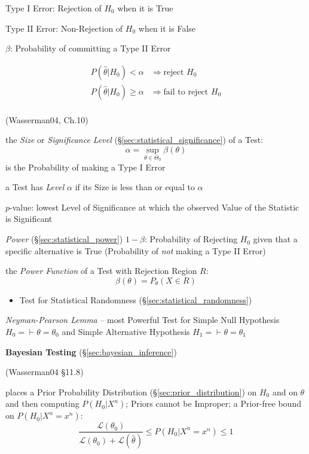 Type I Error: Rejection of $H_0$ when it is True

Type II Error: Non-Rejection of $H_0$ when it is False

$\beta$: Probability of committing a Type II Error

\begin{align*}
  P(\hat{\theta} | H_0) < \alpha & \Rightarrow \text{reject } H_0 \\
  P(\hat{\theta} | H_0) \geq \alpha & \Rightarrow \text{fail to reject } H_0 \\
\end{align*}

(Wasserman04, Ch.10)

the \emph{Size} or \emph{Significance Level}
(\S\ref{sec:statistical_significance}) of a Test:
\[
  \alpha = \sup_{\theta \in \Theta_0} \beta(\theta)
\]
is the Probability of making a Type I Error

a Test has \emph{Level} $\alpha$ if its Size is less than or equal to $\alpha$

$p$-value: lowest Level of Significance at which the observed Value of
the Statistic is Significant

\emph{Power} (\S\ref{sec:statistical_power}) $1 - \beta$: Probability of
Rejecting $H_0$ given that a specific alternative is True (Probability of
\emph{not} making a Type II Error)

the \emph{Power Function} of a Test with Rejection Region $R$:
\[
  \beta(\theta) = P_\theta(X \in R)
\]

\begin{itemize}
  \item Test for Statistical Randomness (\S\ref{sec:statistical_randomness})
\end{itemize}

\emph{Neyman-Pearson Lemma} -- most Powerful Test for Simple Null Hypothesis
$H_0 = \vdash \theta = \theta_0$ and Simple Alternative Hypothesis
$H_1 = \vdash \theta = \theta_1$

\asterism

\textbf{Bayesian Testing} (\S\ref{sec:bayesian_inference})

(Wasserman04 \S11.8)

places a Prior Probability Distribution (\S\ref{sec:prior_distribution}) on
$H_0$ and on $\theta$ and then computing $P(H_0 | X^n)$; Priors cannot be
Improper; a Prior-free bound on $P(H_0|X^n = x^n)$:
\[
  \frac{\mathcal{L}(\theta_0)}{\mathcal{L}(\theta_0) + \mathcal{L}(\hat\theta)}
    \leq P(H_0|X^n = x^n) \leq 1
\]

